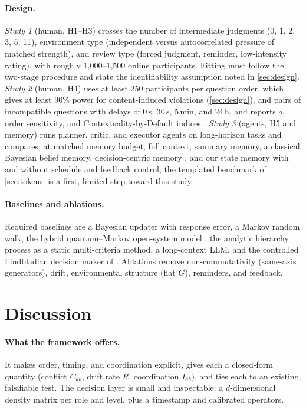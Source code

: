 \documentclass[11pt]{article}
\theoremstyle{definition}
\theoremstyle{remark}
\begin{document}
\paragraph{Design.} \emph{Study 1} (human, H1--H3) crosses the number of intermediate judgments (0, 1, 2, 3, 5, 11), environment type (independent versus autocorrelated pressure of matched strength), and review type (forced judgment, reminder, low-intensity rating), with roughly 1{,}000--1{,}500 online participants. Fitting must follow the two-stage procedure and state the identifiability assumption noted in \cref{sec:design}. \emph{Study 2} (human, H4) uses at least 250 participants per question order, which gives at least 90\% power for content-induced violations (\cref{sec:design}), and pairs of incompatible questions with delays of 0\,s, 30\,s, 5\,min, and 24\,h, and reports $q$, order sensitivity, and Contextuality-by-Default indices \citep{dzhafarov2016}. \emph{Study 3} (agents, H5 and memory) runs planner, critic, and executor agents on long-horizon tasks and compares, at matched memory budget, full context, summary memory, a classical Bayesian belief memory, decision-centric memory \citep{zou2026demem}, and our state memory with and without schedule and feedback control; the templated benchmark of \cref{sec:tokens} is a first, limited step toward this study.

\paragraph{Baselines and ablations.} Required baselines are a Bayesian updater with response error, a Markov random walk, the hybrid quantum--Markov open-system model \citep{busemeyer2020entropy}, the analytic hierarchy process \citep{saaty1980} as a static multi-criteria method, a long-context LLM, and the controlled Lindbladian decision maker of \citet{snow2024}. Ablations remove non-commutativity (same-axis generators), drift, environmental structure (flat $G$), reminders, and feedback.

\section{Discussion}
\label{sec:discussion}

\paragraph{What the framework offers.} It makes order, timing, and coordination explicit, gives each a closed-form quantity (conflict $C_{ab}$, drift rate $R$, coordination $I_{ab}$), and ties each to an existing, falsifiable test. The decision layer is small and inspectable: a $d$-dimensional density matrix per role and level, plus a timestamp and calibrated operators.
\end{document}

